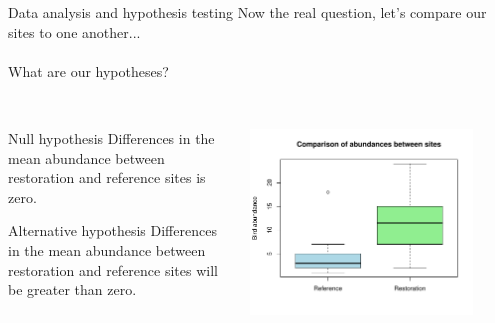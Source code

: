 \documentclass[xcolor=svgnames]{beamer}
\begin{document}
\begin{frame}{Data analysis and hypothesis testing}
Now the real question, let's compare our sites to one another...\\~\\
What are our hypotheses?\\~\\
\begin{columns}
\begin{column}{0.5\textwidth}
\begin{block}{Null hypothesis}
Differences in the mean abundance between restoration and reference sites is zero.
\end{block}
\vspace{0.2in}
\begin{block}{Alternative hypothesis}
Differences in the mean abundance between restoration and reference sites will be greater than zero.
\end{block}
\end{column}
\begin{column}{0.5\textwidth}
\centerline{\includegraphics[width=0.85\textwidth,trim=0in 1in 0.5in 0.5in]{R_for_data_analysis-box2.pdf}}
\end{column}
\end{columns}
\end{frame}
\end{document}
